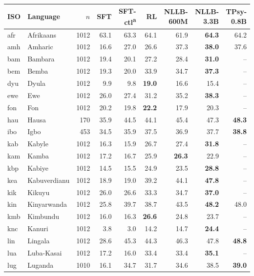 \begin{table}[t]
\centering\footnotesize
\setlength{\tabcolsep}{3pt}
\begin{tabular}{@{}llrrrrrrr@{}}
\toprule
ISO & Language & $n$ & SFT & SFT-ctl\textsuperscript{a} & RL & NLLB-600M & NLLB-3.3B & TPsy-0.8B \\
\midrule
afr & Afrikaans & 1012 & 63.1 & 63.3 & 64.1 & 61.9 & \textbf{64.3} & 64.2 \\
amh & Amharic & 1012 & 16.6 & 27.0 & 26.6 & 37.3 & \textbf{38.0} & 37.6 \\
bam & Bambara & 1012 & 19.4 & 20.1 & 27.2 & 28.4 & \textbf{31.0} & -- \\
bem & Bemba & 1012 & 19.3 & 20.0 & 33.9 & 34.7 & \textbf{37.3} & -- \\
dyu & Dyula & 1012 & 9.9 & 9.8 & \textbf{19.0} & 16.6 & 15.4 & -- \\
ewe & Ewe & 1012 & 26.0 & 27.4 & 31.2 & 35.2 & \textbf{38.3} & -- \\
fon & Fon & 1012 & 20.2 & 19.8 & \textbf{22.2} & 17.9 & 20.3 & -- \\
hau & Hausa & 170 & 35.9 & 44.5 & 44.1 & 45.4 & 47.3 & \textbf{48.3} \\
ibo & Igbo & 453 & 34.5 & 35.9 & 37.5 & 36.9 & 37.7 & \textbf{38.8} \\
kab & Kabyle & 1012 & 16.3 & 15.9 & 26.7 & 27.4 & \textbf{31.8} & -- \\
kam & Kamba & 1012 & 17.2 & 16.7 & 25.9 & \textbf{26.3} & 22.9 & -- \\
kbp & Kabiye & 1012 & 14.5 & 15.5 & 24.9 & 23.5 & \textbf{28.8} & -- \\
kea & Kabuverdianu & 1012 & 18.9 & 19.0 & 39.2 & 44.1 & \textbf{47.8} & -- \\
kik & Kikuyu & 1012 & 26.0 & 26.6 & 33.3 & 34.7 & \textbf{37.0} & -- \\
kin & Kinyarwanda & 1012 & 25.8 & 39.7 & 38.7 & 43.5 & \textbf{48.2} & 48.0 \\
kmb & Kimbundu & 1012 & 16.0 & 16.3 & \textbf{26.6} & 24.8 & 23.7 & -- \\
knc & Kanuri & 1012 & 3.8 & 3.0 & 14.2 & 14.7 & \textbf{24.4} & -- \\
lin & Lingala & 1012 & 28.6 & 45.3 & 44.3 & 46.3 & 47.8 & \textbf{48.8} \\
lua & Luba-Kasai & 1012 & 17.2 & 16.0 & 33.4 & 33.4 & \textbf{35.1} & -- \\
lug & Luganda & 1010 & 16.1 & 34.7 & 31.7 & 34.6 & 38.5 & \textbf{39.0} \\

\end{tabular}
\end{table}
